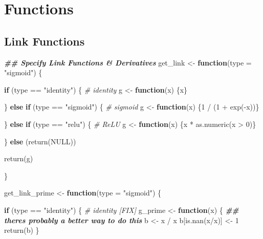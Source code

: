 \documentclass[
]{book}
\newenvironment{Shaded}{\begin{snugshade}}{\end{snugshade}}
\newcommand{\AttributeTok}[1]{\textcolor[rgb]{0.77,0.63,0.00}{#1}}
\newcommand{\CommentTok}[1]{\textcolor[rgb]{0.56,0.35,0.01}{\textit{#1}}}
\newcommand{\ConstantTok}[1]{\textcolor[rgb]{0.00,0.00,0.00}{#1}}
\newcommand{\ControlFlowTok}[1]{\textcolor[rgb]{0.13,0.29,0.53}{\textbf{#1}}}
\newcommand{\DecValTok}[1]{\textcolor[rgb]{0.00,0.00,0.81}{#1}}
\newcommand{\DocumentationTok}[1]{\textcolor[rgb]{0.56,0.35,0.01}{\textbf{\textit{#1}}}}
\newcommand{\FunctionTok}[1]{\textcolor[rgb]{0.00,0.00,0.00}{#1}}
\newcommand{\NormalTok}[1]{#1}
\newcommand{\OtherTok}[1]{\textcolor[rgb]{0.56,0.35,0.01}{#1}}
\newcommand{\SpecialCharTok}[1]{\textcolor[rgb]{0.00,0.00,0.00}{#1}}
\newcommand{\StringTok}[1]{\textcolor[rgb]{0.31,0.60,0.02}{#1}}
\begin{document}
\hypertarget{functions}{%
\section{Functions}\label{functions}}

\hypertarget{link-functions}{%
\subsection{Link Functions}\label{link-functions}}

\begin{Shaded}
\begin{Highlighting}[]
\DocumentationTok{\#\# Specify Link Functions \& Derivatives}
\NormalTok{get\_link }\OtherTok{\textless{}{-}} \ControlFlowTok{function}\NormalTok{(}\AttributeTok{type =} \StringTok{"sigmoid"}\NormalTok{) \{}
  
  \ControlFlowTok{if}\NormalTok{ (type }\SpecialCharTok{==} \StringTok{"identity"}\NormalTok{) \{}
    \CommentTok{\# identity}
\NormalTok{    g }\OtherTok{\textless{}{-}} \ControlFlowTok{function}\NormalTok{(x) \{x\}}
    
\NormalTok{  \} }\ControlFlowTok{else} \ControlFlowTok{if}\NormalTok{ (type }\SpecialCharTok{==} \StringTok{"sigmoid"}\NormalTok{) \{}
    \CommentTok{\# sigmoid}
\NormalTok{    g }\OtherTok{\textless{}{-}} \ControlFlowTok{function}\NormalTok{(x) \{}\DecValTok{1} \SpecialCharTok{/}\NormalTok{ (}\DecValTok{1} \SpecialCharTok{+} \FunctionTok{exp}\NormalTok{(}\SpecialCharTok{{-}}\NormalTok{x))\}}
    
\NormalTok{  \} }\ControlFlowTok{else} \ControlFlowTok{if}\NormalTok{ (type }\SpecialCharTok{==} \StringTok{"relu"}\NormalTok{) \{}
    \CommentTok{\# ReLU}
\NormalTok{    g }\OtherTok{\textless{}{-}} \ControlFlowTok{function}\NormalTok{(x) \{x }\SpecialCharTok{*} \FunctionTok{as.numeric}\NormalTok{(x }\SpecialCharTok{\textgreater{}} \DecValTok{0}\NormalTok{)\}}
    
\NormalTok{  \} }\ControlFlowTok{else}\NormalTok{ (}\FunctionTok{return}\NormalTok{(}\ConstantTok{NULL}\NormalTok{))}
  
  \FunctionTok{return}\NormalTok{(g)}

\NormalTok{\}}

\NormalTok{get\_link\_prime }\OtherTok{\textless{}{-}} \ControlFlowTok{function}\NormalTok{(}\AttributeTok{type =} \StringTok{"sigmoid"}\NormalTok{) \{}
  
  \ControlFlowTok{if}\NormalTok{ (type }\SpecialCharTok{==} \StringTok{"identity"}\NormalTok{) \{}
    \CommentTok{\# identity [FIX]}
\NormalTok{    g\_prime }\OtherTok{\textless{}{-}} \ControlFlowTok{function}\NormalTok{(x) \{}
      \DocumentationTok{\#\# there\textquotesingle{}s probably a better way to do this}
\NormalTok{      b }\OtherTok{\textless{}{-}}\NormalTok{ x }\SpecialCharTok{/}\NormalTok{ x}
\NormalTok{      b[}\FunctionTok{is.nan}\NormalTok{(x}\SpecialCharTok{/}\NormalTok{x)] }\OtherTok{\textless{}{-}} \DecValTok{1}
      \FunctionTok{return}\NormalTok{(b)}
\NormalTok{    \}}
    

\end{Highlighting}
\end{Shaded}
\end{document}
